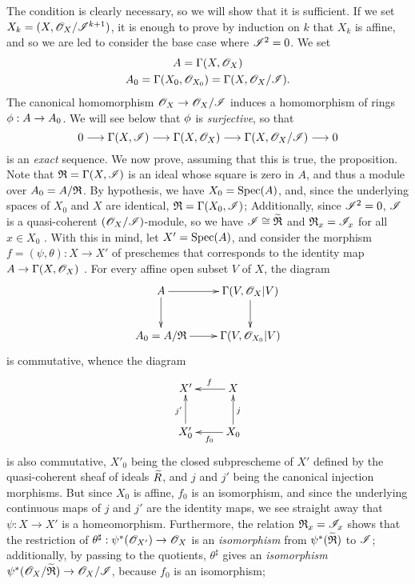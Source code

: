 The condition is clearly necessary, so we will show that it is sufficient.
If we set $X_k=(X,\mathscr{O}_X/\mathscr{I}^{k+1})$, it is enough to prove by induction on $k$ that $X_k$ is affine, and so we are led to consider the base case where $\mathscr{I}^2=0$.
We set
\begin{gather*}
    A = \Gamma(X,\mathscr{O}_X)\\
    A_0 = \Gamma(X_0,\mathscr{O}_{X_0})=\Gamma(X,\mathscr{O}_X/\mathscr{I}).
\end{gather*}
The canonical homomorphism $\OO_X\to\OO_X/\sh{I}$ induces a homomorphism of rings $\vphi:A\to A_0$.
We will see below that $\phi$ is \emph{surjective}, so that
\begin{equation*}
    0 \to \Gamma(X,\sh{I}) \to \Gamma(X,\OO_X) \to \Gamma(X,\OO_X/\sh{I}) \to 0
\end{equation*}
is an \emph{exact} sequence.
We now prove, assuming that this is true, the proposition.
Note that $\mathfrak{R}=\Gamma(X,\mathscr{I})$ is an ideal whose square is zero in $A$, and thus a module over $A_0=A/\mathfrak{R}$.
By hypothesis, we have $X_0={\mathop{\mathrm{Spec}}\nolimits}(A)$, and, since the underlying spaces of $X_0$ and $X$ are identical, $\mathfrak{R}=\Gamma(X_0,\mathscr{I})$;
Additionally, since $\mathscr{I}^2=0$, $\mathscr{I}$ is a quasi-coherent $(\mathscr{O}_X/\mathscr{I})$-module, so we have $\mathscr{I}\cong\widetilde{\mathfrak{R}}$ and $\mathfrak{R}_x=\mathscr{I}_x$ for all $x\in X_0$ .
With this in mind, let $X'={\mathop{\mathrm{Spec}}\nolimits}(A)$, and consider the morphism $f=(\psi,\theta):X\to X'$ of preschemes that corresponds to the identity map $A\to\Gamma(X,\OO_X)$ .
For every affine open subset $V$ of $X$, the diagram
\[
  \xymatrix{
    A \ar[r] \ar[d]
    & \Gamma(V,\OO_X|V) \ar[d]\\
    A_0=A/\fk{R} \ar[r]
    & \Gamma(V,\OO_{X_0}|V)
  }
\]
is commutative, whence the diagram
\[
  \xymatrix{
    X'
    & X \ar[l]_f\\
    X'_0 \ar[u]^{j'}
    & X_0 \ar[l]^{f_0} \ar[u]_j
  }
\]
is also commutative, $X'_0$ being the closed subprescheme of $X'$ defined by the quasi-coherent sheaf of ideals $\widetilde{R}$, and $j$ and $j'$ being the canonical injection morphisms.
But since $X_0$ is affine, $f_0$ is an isomorphism, and since the underlying continuous maps of $j$ and $j'$ are the identity maps, we see straight away that $\psi:X\to X'$ is a homeomorphism.
Furthermore, the relation $\mathfrak{R}_x=\mathscr{I}_x$ shows that the restriction of $\theta^\sharp:\psi^*(\OO_{X'})\to\OO_X$ is an \emph{isomorphism} from $\psi^*(\widetilde{\mathfrak{R}})$ to $\mathscr{I}$;
additionally, by passing to the quotients, $\theta^\sharp$ gives an \emph{isomorphism} $\psi^*(\OO_X/\wt{\fk{R}})\to\OO_X/\sh{I}$, because $f_0$ is an isomorphism;
